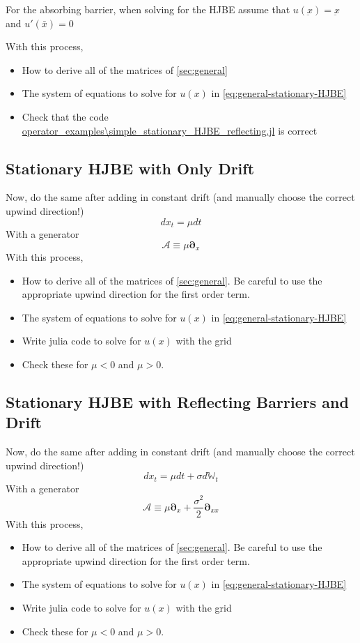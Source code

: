 \documentclass[11pt]{article}
\newcommand{\D}[1][]{\ensuremath{\boldsymbol{\partial}_{#1}}}
\newcommand{\W}{\ensuremath{\mathbb{W}}}
\newcommand{\A}{\ensuremath{\mathcal{A}}}
\begin{document}
For the absorbing barrier, when solving for the HJBE assume that $u(\underbar{x}) = \underbar{x}$ and $u'(\bar{x}) = 0$


With this process,
\begin{itemize}
	\item How to derive all of the matrices of \cref{sec:general}
	\item The system of equations to solve for $u(x)$ in \cref{eq:general-stationary-HJBE}
	\item Check that the code \url{operator_examples\simple_stationary_HJBE_reflecting.jl} is correct
\end{itemize}


\subsection{Stationary HJBE with Only Drift}
Now, do the same after adding in constant drift (and manually choose the correct upwind direction!)
$$
d x_t = \mu dt
$$
With a generator
$$
	\A \equiv \mu \D[x]
$$
With this process,
\begin{itemize}
	\item How to derive all of the matrices of \cref{sec:general}.  Be careful to use the appropriate upwind direction for the first order term.
	\item The system of equations to solve for $u(x)$ in \cref{eq:general-stationary-HJBE}
	\item Write julia code to solve for $u(x)$ with the grid
	\item Check these for $\mu < 0$ and $\mu > 0$.
\end{itemize}


\subsection{Stationary HJBE with Reflecting Barriers and Drift}
Now, do the same after adding in constant drift (and manually choose the correct upwind direction!)
$$
d x_t = \mu dt + \sigma d\W_t
$$
With a generator
$$
	\A \equiv \mu \D[x] + \frac{\sigma^2}{2}\D[xx]
$$
With this process,
\begin{itemize}
	\item How to derive all of the matrices of \cref{sec:general}.  Be careful to use the appropriate upwind direction for the first order term.
	\item The system of equations to solve for $u(x)$ in \cref{eq:general-stationary-HJBE}
	\item Write julia code to solve for $u(x)$ with the grid
	\item Check these for $\mu < 0$ and $\mu > 0$.
\end{itemize}
\end{document}
